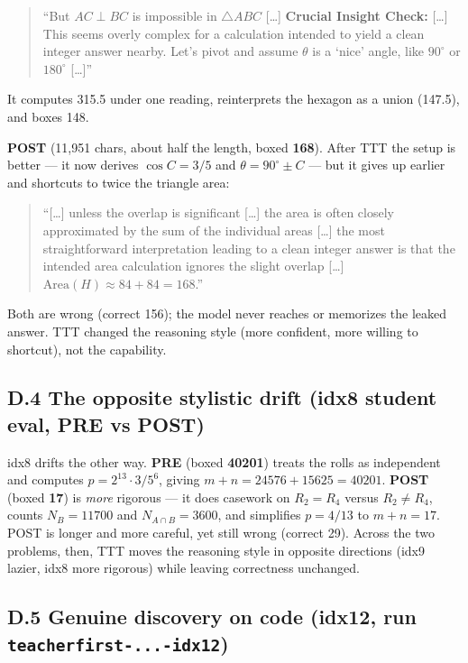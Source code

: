 \begin{quote}
``But \(AC \perp BC\) is impossible in \(\triangle ABC\) {[}\ldots{]} \textbf{Crucial Insight Check:} {[}\ldots{]} This seems overly complex for a calculation intended to yield a clean integer answer nearby. Let's pivot and assume \(\theta\) is a `nice' angle, like \(90^\circ\) or \(180^\circ\) {[}\ldots{]}''
\end{quote}

It computes 315.5 under one reading, reinterprets the hexagon as a union (147.5), and boxes 148.

\textbf{POST} (11,951 chars, about half the length, boxed \textbf{168}). After TTT the setup is better --- it now derives \(\cos C = 3/5\) and \(\theta = 90^\circ \pm C\) --- but it gives up earlier and shortcuts to twice the triangle area:

\begin{quote}
``{[}\ldots{]} unless the overlap is significant {[}\ldots{]} the area is often closely approximated by the sum of the individual areas {[}\ldots{]} the most straightforward interpretation leading to a clean integer answer is that the intended area calculation ignores the slight overlap {[}\ldots{]} \(\text{Area}(H) \approx 84 + 84 = 168\).''
\end{quote}

Both are wrong (correct 156); the model never reaches or memorizes the leaked answer. TTT changed the reasoning style (more confident, more willing to shortcut), not the capability.

\subsection{D.4 The opposite stylistic drift (idx8 student eval, PRE vs POST)}\label{d.4-the-opposite-stylistic-drift-idx8-student-eval-pre-vs-post}

idx8 drifts the other way. \textbf{PRE} (boxed \textbf{40201}) treats the rolls as independent and computes \(p = 2^{13}\cdot 3 / 5^6\), giving \(m+n = 24576 + 15625 = 40201\). \textbf{POST} (boxed \textbf{17}) is \emph{more} rigorous --- it does casework on \(R_2 = R_4\) versus \(R_2 \neq R_4\), counts \(N_B = 11700\) and \(N_{A\cap B} = 3600\), and simplifies \(p = 4/13\) to \(m+n = 17\). POST is longer and more careful, yet still wrong (correct 29). Across the two problems, then, TTT moves the reasoning style in opposite directions (idx9 lazier, idx8 more rigorous) while leaving correctness unchanged.

\subsection{\texorpdfstring{D.5 Genuine discovery on code (idx12, run \texttt{teacherfirst-...-idx12})}{D.5 Genuine discovery on code (idx12, run teacherfirst-...-idx12)}}\label{d.5-genuine-discovery-on-code-idx12-run-teacherfirst-...-idx12}

